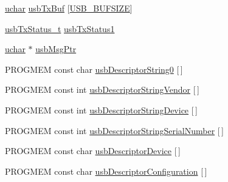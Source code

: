\begin{DoxyCompactItemize}
\item 
\hyperlink{mhvlib-_vusb-_console_2vusb_2usbdrv_8h_aa8ddf20cdd716b652e76e23e5e700893}{uchar} \hyperlink{mhvlib-_vusb-_keyboard_2vusb_2usbdrv_8c_a2e8d07fcad8aa462b6a1f51e7968f3cb}{usb\-Tx\-Buf} \mbox{[}\hyperlink{mhvlib-_vusb-_console_2vusb_2usbdrv_8h_a1c541dbab181ea7bd3da61b892430988}{U\-S\-B\-\_\-\-B\-U\-F\-S\-I\-Z\-E}\mbox{]}
\item 
\hyperlink{mhvlib-_vusb-_keyboard_2vusb_2usbdrv_8h_ae6a25e02d49899e1862aa987a6c09ade}{usb\-Tx\-Status\-\_\-t} \hyperlink{mhvlib-_vusb-_keyboard_2vusb_2usbdrv_8c_a8787d5ad73afd0d305818dfbdce2bc85}{usb\-Tx\-Status1}
\item 
\hyperlink{mhvlib-_vusb-_console_2vusb_2usbdrv_8h_aa8ddf20cdd716b652e76e23e5e700893}{uchar} $\ast$ \hyperlink{mhvlib-_vusb-_keyboard_2vusb_2usbdrv_8c_a5f78c8584830588b8c0c8f2a27772f8e}{usb\-Msg\-Ptr}
\item 
P\-R\-O\-G\-M\-E\-M const char \hyperlink{mhvlib-_vusb-_keyboard_2vusb_2usbdrv_8c_a367afe22c903b4b58805cc451c22cb99}{usb\-Descriptor\-String0} \mbox{[}$\,$\mbox{]}
\item 
P\-R\-O\-G\-M\-E\-M const int \hyperlink{mhvlib-_vusb-_keyboard_2vusb_2usbdrv_8c_aa92b0dfd57d302ff023bfb7ed868c2a1}{usb\-Descriptor\-String\-Vendor} \mbox{[}$\,$\mbox{]}
\item 
P\-R\-O\-G\-M\-E\-M const int \hyperlink{mhvlib-_vusb-_keyboard_2vusb_2usbdrv_8c_a1f252008bbf46a3172ebf8a4f8213a60}{usb\-Descriptor\-String\-Device} \mbox{[}$\,$\mbox{]}
\item 
P\-R\-O\-G\-M\-E\-M const int \hyperlink{mhvlib-_vusb-_keyboard_2vusb_2usbdrv_8c_a97aa1ed300e711b6eabb5cef561313a3}{usb\-Descriptor\-String\-Serial\-Number} \mbox{[}$\,$\mbox{]}
\item 
P\-R\-O\-G\-M\-E\-M const char \hyperlink{mhvlib-_vusb-_keyboard_2vusb_2usbdrv_8c_a1b8593e30029ecfd59a89335a12db631}{usb\-Descriptor\-Device} \mbox{[}$\,$\mbox{]}
\item 
P\-R\-O\-G\-M\-E\-M const char \hyperlink{mhvlib-_vusb-_keyboard_2vusb_2usbdrv_8c_a9a566690103d3a34df4893e7c0d3bf10}{usb\-Descriptor\-Configuration} \mbox{[}$\,$\mbox{]}
\end{DoxyCompactItemize}


